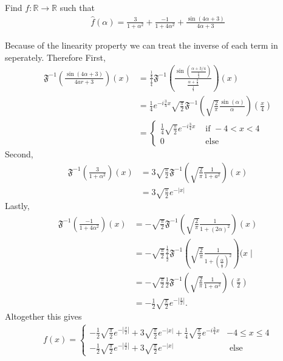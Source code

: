 \documentclass[11pt]{article}
\begin{document}
\begin{exercise}
    Find $f : \mathbb R \to \mathbb R$ such that 
    \begin{align*}
        \hat f(\alpha) = \frac{3}{1+\alpha^{2}} + \frac{-1}{1+4\alpha^{2}} + \frac{ \sin( 4 \alpha + 3 ) }{ 4 \alpha + 3 }
    \end{align*}
\end{exercise}
\begin{solution}   Because of the linearity property we can treat the inverse of each term in seperately. Therefore 
    First,
    \begin{align*} 
        \mathfrak{F}^{-1}\left(\frac{\sin (4 \alpha+3)}{4 a r+3}\right)(x) & =\frac{\frac{1}{4}}{\frac{1}{4}} \mathfrak{F}^{-1}\left(\frac{\sin \left(\frac{\alpha+3 / 4}{\frac{1}{4}}\right)}{\frac{\alpha+\frac{3}{4}}{\frac{1}{4}}}\right)(x) \\ & =\frac{1}{4} e^{-i \frac{3}{4} x} \sqrt{\frac{\pi}{2}} \mathfrak{F}^{-1}\left(\sqrt{\frac{2}{\pi}} \frac{\sin (\alpha)}{\alpha}\right)\left(\frac{x}{4}\right) \\ & = \begin{cases}\frac{1}{4} \sqrt{\frac{\pi}{2}} e^{-i \frac{3}{4} x} & \text { if }-4 < x < 4 \\ 0 & \text { else }\end{cases} 
    \end{align*}
    Second,
    \begin{align*} 
        \mathfrak{F}^{-1}\left(\frac{3}{1+\alpha^2}\right)(x) & =3 \sqrt{\frac{\pi}{2}} \mathfrak{F}^{-1}\left(\sqrt{\frac{2}{\pi}} \frac{1}{1+a^2}\right)(x) \\ & =3 \sqrt{\frac{\pi}{2}} e^{-|x|}
    \end{align*}
    Lastly,
    \begin{align*} 
        \mathfrak{F}^{-1}\left(\frac{-1}{1+4 \alpha^2}\right)(x) 
        & =
        -\sqrt{\frac{\pi}{2}} \mathfrak{F}^{-1}\left(\sqrt{\frac{2}{\pi}} \frac{1}{1+(2 \alpha)^2}\right)(x) 
        \\ & 
        =
        -\sqrt{\frac{\pi}{2}} \frac{\frac{1}{2}}{\frac{1}{2}} \mathfrak{F}^{-1}\left(\sqrt{\frac{2}{\pi}} \frac{1}{1+\left(\frac{\alpha}{\frac{1}{2}}\right)^2}\right)(x \mid 
        \\ &
        =
        -\sqrt{\frac{\pi}{2}} \frac{1}{2} \mathfrak{F}^{-1}\left(\sqrt{\frac{2}{\pi}} \frac{1}{1+\alpha^2}\right)\left(\frac{x}{2}\right) 
        \\ & 
        =
        -\frac{1}{2} \sqrt{\frac{\pi}{2}} e^{-\left|\frac{x}{2}\right|}
        .
    \end{align*}
    Altogether this gives
    \begin{align*} 
        f(x) = \begin{cases}-\frac{1}{2} \sqrt{\frac{\pi}{2}} e^{-\left|\frac{x}{2}\right|}+3 \sqrt{\frac{\pi}{2}} e^{-|x|}+\frac{1}{4} \sqrt{\frac{\pi}{2}} e^{-i \frac{3}{4} x} & -4 \leq x \leq 4 \\ -\frac{1}{2} \sqrt{\frac{\pi}{2}} e^{-\left|\frac{x}{2}\right|}+3 \sqrt{\frac{\pi}{2}} e^{-|x|} & \text { else }\end{cases}
    \end{align*}
    

\end{solution}
\end{document}

